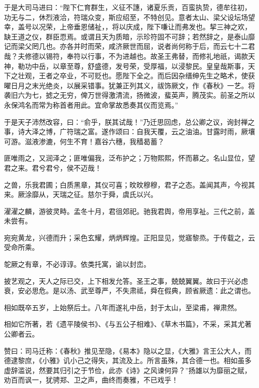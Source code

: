 \documentclass[12pt,UTF8]{ctexbook}
\begin{document}
于是大司马进曰：“陛下仁育群生，义征不譓，诸夏乐贡，百蛮执贽，德牟往初，功无与二，休烈液洽，符瑞众变，斯应绍至，不特创见。意者太山、梁父设坛场望幸，盖号以况荣，上帝垂恩储祉，，将以庆成，陛下嗛让而弗发也。挈三神之欢，缺王道之仪，群臣恧焉。或谓且天为质暗，示珍符固不可辞；若然辞之，是泰山靡记而梁父罔几也。亦各并时而荣，咸济厥世而屈，说者尚何称于后，而云七十二君哉？夫修德以锡符，奉符以行事，不为进越也。故圣王弗替，而修礼地祇，谒款天神，勒功中岳，以章至尊，舒盛德，发号荣，受厚福，以浸黎民。皇皇哉斯事，天下之壮观，王者之卒业，不可贬也。愿陛下全之。而后因杂缙绅先生之略术，使获曜日月之末光绝炎，以展采错事。犹兼正列其义，祓饰厥文，作《春秋》一艺。将袭旧六为七，摅之无穷，俾万世得激清流，扬微波，蜚英声，腾茂实。前圣之所以永保鸿名而常为称首者用此。宜命掌故悉奏其仪而览焉。”



于是天子沛然改容，曰：“俞乎，朕其试哉！”乃迁思回虑，总公卿之议，询封禅之事，诗大泽之博，广符瑞之富。遂作颂曰：自我天覆，云之油油。甘露时雨，厥壤可游。滋液渗漉，何生不育！嘉谷六穗，我穑曷蓄？



匪唯雨之，又润泽之；匪唯偏我，泛布护之；万物熙熙，怀而慕之。名山显位，望君之来。君兮君兮，侯不迈哉！



之兽，乐我君圃；白质黑章，其仪可喜；旼旼穆穆，君子之态。盖闻其声，今视其来。厥涂靡从，天瑞之征。慈尔于舜，虞氏以兴。



濯濯之麟，游彼灵畤。孟冬十月，君徂郊祀。驰我君舆，帝用享祉。三代之前，盖未尝有。



宛宛黄龙，兴德而升；采色玄耀，炳炳辉煌。正阳显见，觉寤黎烝。于传载之，云受命所乘。



鸵厥之有章，不必谆谆。依类托寓，谕以封峦。



披艺观之，天人之际已交，上下相发允答。圣王之事，兢兢翼翼。故曰于兴必虑衰，安必思危。是以汤、武至尊严，不失肃祗，舜在假典，顾省厥遗：此之谓也。



相如既卒五岁，上始祭后土。八年而遂礼中岳，封于太山，至梁甫，禅肃然。



相如它所著，若《遗平陵侯书》、《与五公子相难》、《草木书篇》，不采，采其尤著公卿者云。



赞曰：司马迁称：《春秋》推见至隐，《易本》隐以之显，《大雅》言王公大人，而德逮黎庶，《小雅》讥小己之得失，其流及上。所言虽殊，其合德一也。相如虽多虚辞滥说，然要其归引之于节俭，此亦《诗》之风谏何异？”扬雄以为靡丽之赋，劝百而讽一，犹骋郑、卫之声，曲终而奏雅，不已戏乎！
\end{document}
